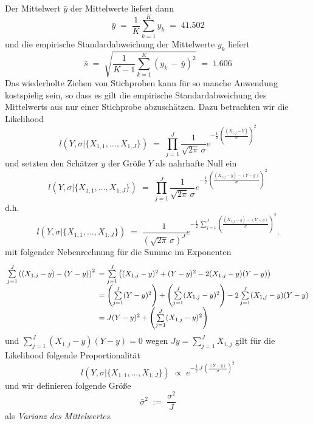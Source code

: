 Der Mittelwert $\bar y$ der Mittelwerte liefert dann
$$
\bar y \; = \; \frac{1}{K} \sum\limits_{k=1}^K y_k \; = \; 41.502
$$
und die empirische Standardabweichung der Mittelwerte $y_k$ liefert
$$
\bar s \; = \; \sqrt{\frac{1}{K-1} \sum\limits_{k=1}^K (y_k \, - \, \bar y)^2 }
 \; = \; 1.606
$$
Das wiederholte Ziehen von Stichproben kann für so manche Anwendung kostspielig sein,
so dass es gilt die empirische Standardabweichung des Mittelwerts aus nur einer
Stichprobe abzuschätzen.
Dazu betrachten wir die Likelihood 
\begin{equation}
l(Y, \sigma | \{X_{1,1}, \dots, X_{1,J}\}) \; = \;
\prod\limits_{j=1}^J \frac{1}{\sqrt{2 \pi} \, \sigma}
 e^{- \frac{1}{2} \, \left( \frac{(X_{1,j} - Y)}{\sigma} \right)^2 } 
\label{LikelihoodY}
\end{equation}
und
setzten den Schätzer $y$ der Größe $Y$ als nahrhafte Null ein
\begin{equation}
l(Y, \sigma | \{X_{1,1}, \dots, X_{1,J}\}) \; = \;
\prod\limits_{j=1}^J \frac{1}{\sqrt{2 \pi} \, \sigma}
 e^{- \frac{1}{2} \, \left( \frac{(X_{1,j} - y) - (Y - y)}{\sigma} \right)^2 } 
\label{LikelihoodNahrhafteNull}
\end{equation}
d.h.
\begin{equation}
l(Y, \sigma | \{X_{1,1}, \dots, X_{1,J}\}) \; = \;
 \frac{1}{(\sqrt{2 \pi} \, \sigma)^J}
 e^{- \frac{1}{2} \, \sum\limits_{j=1}^J \left( \frac{(X_{1,j} - y) - (Y - y)}{\sigma} \right)^2 } .
\end{equation}
mit folgender Nebenrechnung für die Summe im Exponenten
$$
\arraycolsep=2.4pt\def\arraystretch{2}
\begin{array}{ll}
\sum\limits_{j=1}^J \left( (X_{1,j} - y) - (Y - y) \right)^2  & =
\sum\limits_{j=1}^J \left( (X_{1,j} - y)^2 + (Y - y)^2 - 2 (X_{1,j} - y) (Y - y) \right) \\
 & = \left( \sum\limits_{j=1}^J  (Y - y)^2\right) + 
 \left( \sum\limits_{j=1}^J  (X_{1,j} - y)^2\right) - 2 \sum\limits_{j=1}^J (X_{1,j} - y) (Y - y)\\
 & = J (Y - y)^2 + 
 \left( \sum\limits_{j=1}^J  (X_{1,j} - y)^2\right)
\end{array}
$$
und $\sum\limits_{j=1}^J (X_{1,j} - y) (Y - y) = 0$ wegen $J y = \sum\limits_{j=1}^J X_{1,j}$
gilt für die Likelihood folgende Proportionalität
\begin{equation}
l(Y, \sigma | \{X_{1,1}, \dots, X_{1,J}\}) \; \propto \;
 e^{- \frac{1}{2} \, J \, \left( \frac{(Y - y)}{\sigma} \right)^2 }
\label{LikelihoodmitJ}
\end{equation}
und wir definieren folgende Größe
\begin{equation}
\bar \sigma^2 \; := \; \frac{\sigma^2}{J}
\label{VarianzMittelwert}
\end{equation}
als \textsl{Varianz des Mittelwertes}.

